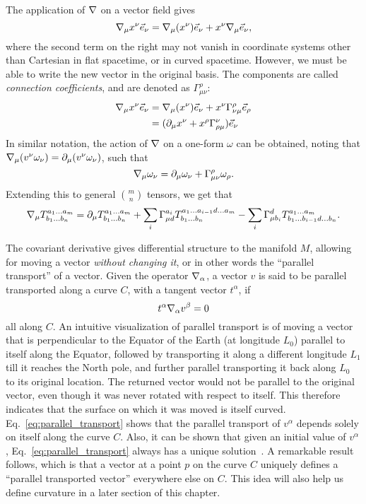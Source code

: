 The application of $\nabla$ on a vector field gives
%
\begin{equation}
 \nabla_\mu x^{\nu} \vec{e}_\nu = \nabla_\mu (x^\nu) \vec{e}_\nu + x^\nu \nabla_\mu \vec{e}_\nu,
\end{equation}
%
where the second term on the right may not vanish in coordinate systems 
other than Cartesian in flat spacetime, or in curved spacetime. However, 
we must be able to write the new vector in the original basis. The components
are called {\it connection coefficients}, and are denoted as $\Gamma^\rho_{\mu\nu}$:
%
\begin{align}\label{eq:covariant_derivative}
 \cd_\mu x^{\nu} \vec{e}_\nu &= \cd_\mu (x^\nu) \vec{e}_\nu + x^\nu \Gamma^\rho_{\nu\mu} \vec{e}_\rho \\
 &= (\pd_\mu x^\nu + x^\rho \Gamma^\nu_{\rho\mu}) \vec{e}_\nu
\end{align}
In similar notation, the action of $\nabla$ on a one-form $\omega$ can be obtained, 
noting that $\nabla_\mu (v^\nu \omega_\nu) = \partial_\mu (v^\nu \omega_\nu)$, such that
%
\begin{equation}
 \nabla_\mu \omega_\nu = \partial_\mu\omega_\nu + \Gamma^\rho_{\mu\nu}\omega_\rho.
\end{equation}
Extending this to general ${m\choose n}$ tensors, we get that 
\begin{equation}
 \nabla_\mu T^{a_1\dots a_m}_{b_1\dots b_n} = \partial_\mu T^{a_1\dots a_m}_{b_1\dots b_n} + \displaystyle\sum\limits_{i} \Gamma^{a_i}_{\mu d} T^{a_1\dots a_{i-1} d\dots a_m}_{b_1\dots b_n} - \displaystyle\sum\limits_{i} \Gamma^{d}_{\mu b_i} T^{a_1\dots a_m}_{b_1\dots b_{i-1} d\dots b_n}.
\end{equation}

The covariant derivative gives differential structure to the manifold $M$, 
allowing for moving a vector {\it without changing it}, or in other words
the ``parallel transport'' of a vector. Given the operator $\nabla_\alpha$, a vector 
$v$ is said to be parallel transported along a curve $C$, with a tangent 
vector $t^\alpha$, if 
\begin{equation}\label{eq:parallel_transport}
 t^\alpha \cd_\alpha v^\beta = 0
\end{equation}
all along $C$. An intuitive visualization of parallel transport is of 
moving a vector that is perpendicular to the Equator of the Earth (at longitude
$L_0$) parallel to itself along the Equator, followed by transporting it along
a different longitude $L_1$ till it reaches the North pole, and further
parallel transporting it back along $L_0$ to its original location.
The returned vector would not be parallel to the original vector, even 
though it was never rotated with respect to itself. This therefore 
indicates that the surface on which it was moved is itself curved.
Eq.~\ref{eq:parallel_transport} shows that the parallel transport 
of $v^\alpha$ depends solely on itself along the curve $C$. Also, 
it can be shown that given an initial value of $v^\alpha$,
Eq.~\ref{eq:parallel_transport} always has a unique solution~\cite{WaldBook}. 
A remarkable result follows, which is that a vector at a point $p$ on the curve
$C$ uniquely defines a ``parallel transported vector'' everywhere else on $C$.
This idea will also help us define curvature in a later section of this 
chapter.

